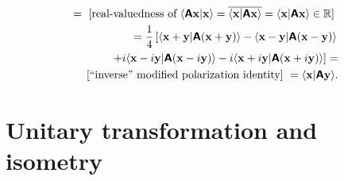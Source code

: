 {\begin{equation}
\begin{split}
=  \text{ [real-valuedness of $\langle \textsf{\textbf{A}} {\bf x}\vert {\bf x}\rangle
= \overline{\langle {\bf x}\vert \textsf{\textbf{A}}{\bf x}\rangle }
=
\langle {\bf x}\vert \textsf{\textbf{A}}{\bf x}\rangle \in \mathbb{R}$] } \\
=
\frac{1}{4}\left[
\langle {\bf x}+ {\bf y} \vert \textsf{\textbf{A}} ({\bf x}+ {\bf y})\rangle
-
\langle {\bf x}- {\bf y} \vert \textsf{\textbf{A}}({\bf x}- {\bf y})\rangle \right.  \\
\left.
+ i
\langle {\bf x}- i{\bf y} \vert \textsf{\textbf{A}} ({\bf x}- i{\bf y})\rangle
- i
\langle {\bf x}+ i{\bf y} \vert \textsf{\textbf{A}} ({\bf x} +i {\bf y})\rangle
\right]
= \\
\text{ [``inverse'' modified polarization identity] } =
\langle {\bf x}\vert \textsf{\textbf{A}}{\bf y}\rangle
.
\end{split}
\label{2015-m-ch-polidrv}
\end{equation}
\eproof
}




\section{Unitary transformation and isometry}
\label{2014-m-ch-fdvs-unitary}


